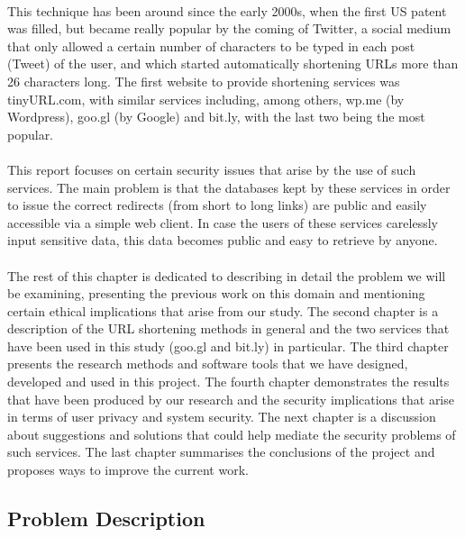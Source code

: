 \documentclass[12pt]{article}
\begin{document}
\paragraph{}
This technique has been around since the early 2000s, when the first US patent was filled, but became really popular by the coming of Twitter, a social medium that only allowed a certain number of characters to be typed in each post (Tweet) of the user, and which started automatically shortening URLs more than 26 characters long. The first website to provide shortening services was tinyURL.com, with similar services including, among others, wp.me (by Wordpress), goo.gl (by Google) and bit.ly, with the last two being the most popular. 
\paragraph{}
This report focuses on certain security issues that arise by the use of such services. The main problem is that the databases kept by these services in order to issue the correct redirects (from short to long links) are public and easily accessible via a simple web client. In case the users of these services carelessly input sensitive data, this data becomes public and easy to retrieve by anyone.
\paragraph{} 
The rest of this chapter is dedicated to describing in detail the problem we will be examining, presenting the previous work on this domain and mentioning certain ethical implications that arise from our study. The second chapter is a description of the URL shortening methods in general and the two services that have been used in this study (goo.gl and bit.ly) in particular. The third chapter presents the research methods and software tools that we have designed, developed and used in this project. The fourth chapter demonstrates the results that have been produced by our research and the security implications that arise in terms of user privacy and system security. The next chapter is a discussion about suggestions and solutions that could help mediate the security problems of such services. The last chapter summarises the conclusions of the project and proposes ways to improve the current work. 
\subsection{Problem Description}
\end{document}

